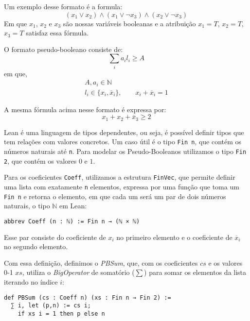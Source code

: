 \documentclass[conference]{IEEEtran}
\begin{document}
Um exemplo desse formato é a formula:
\begin{equation}
    (x_1 \lor x_2) \land (x_1 \lor \neg x_3) \land (x_2 \lor \neg x_3)
\end{equation}
Em que $x_1$, $x_2$ e $x_3$ são nossas variáveis booleanas e a atribuição $x_1=T$, $x_2=T$, $x_3=T$ satisfaz essa fórmula.

O formato pseudo-booleano consiste de:
\begin{equation}
    \sum_i{a_i l_i} \ge A
\end{equation}
em que,
\begin{equation}
    \begin{gathered}
        A, a_i \in \mathbb{N} \\
        l_i \in \{ x_i, \overline x_i \}, \qquad x_i + \overline x_i = 1
    \end{gathered}
\end{equation}

A mesma fórmula acima nesse formato é expressa por:
\begin{equation}
    x_1 + x_2 + \overline x_3 \ge 2
\end{equation}

Lean é uma linguagem de tipos dependentes, ou seja, é possível definir tipos que tem relações com valores concretos.
Um caso útil é o tipo \texttt{Fin n}, que contém os números naturais até \texttt{n}.
Para modelar os Pseudo-Booleanos utilizamos o tipo \texttt{Fin 2}, que contém os valores $0$ e $1$.

Para os coeficientes \texttt{Coeff}, utilizamos a estrutura \texttt{FinVec},
que permite definir uma lista com exatamente \texttt{n} elementos,
expressa por uma função que toma um \texttt{Fin n} e retorna o elemento,
em que cada um será um par de dois números naturais, o tipo $\mathbb{N}$ em Lean:
\begin{verbatim}
abbrev Coeff (n : ℕ) := Fin n → (ℕ × ℕ)
\end{verbatim}

Esse par consiste do coeficiente de $x_i$ no primeiro elemento e
o coeficiente de $\overline x_i$ no segundo elemento.

Com essa definição, definimos o \textit{PBSum}, que, com os coeficientes $cs$ e os valores 0-1 $xs$,
utiliza o \textit{BigOperator} de somatório ($\sum$) para somar os elementos da lista iterando no índice $i$:
\begin{verbatim}
def PBSum (cs : Coeff n) (xs : Fin n → Fin 2) :=
  ∑ i, let (p,n) := cs i;
    if xs i = 1 then p else n
\end{verbatim}
\end{document}
